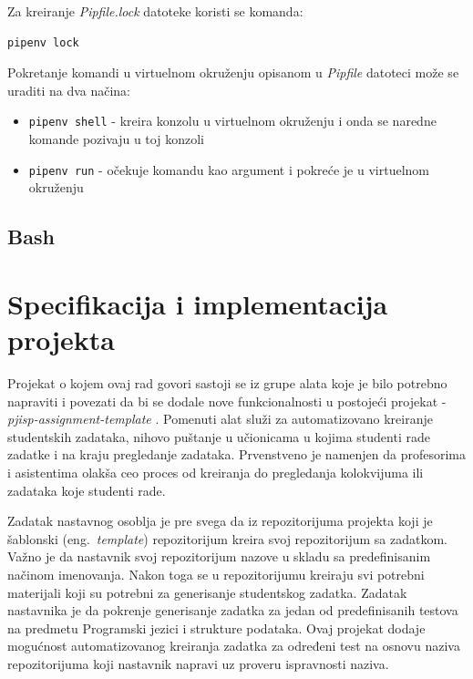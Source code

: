\documentclass[12pt]{report}
\begin{document}
Za kreiranje \textit{Pipfile.lock} datoteke koristi se komanda:

\begin{verbatim}
pipenv lock
\end{verbatim}

Pokretanje komandi u virtuelnom okruženju opisanom u \textit{Pipfile} datoteci može se uraditi na dva načina:

\begin{itemize}
    \item \texttt{pipenv shell} - kreira konzolu u virtuelnom okruženju i onda se naredne komande pozivaju u toj konzoli
    \item \texttt{pipenv run} - očekuje komandu kao argument i pokreće je u virtuelnom okruženju
\end{itemize}

\section{Bash}

\chapter{Specifikacija i implementacija projekta}

Projekat o kojem ovaj rad govori sastoji se iz grupe alata koje je bilo potrebno napraviti i povezati da bi se dodale nove funkcionalnosti u postojeći projekat - \textit{pjisp-assignment-template} \cite{pjisp-assignment-template}. Pomenuti alat služi za automatizovano kreiranje studentskih zadataka, nihovo puštanje u učionicama u kojima studenti rade zadatke i na kraju pregledanje zadataka. Prvenstveno je namenjen da profesorima i asistentima olakša ceo proces od kreiranja do pregledanja kolokvijuma ili zadataka koje studenti rade.

Zadatak nastavnog osoblja je pre svega da iz repozitorijuma projekta koji je šablonski (eng.\ \textit{template}) repozitorijum kreira svoj repozitorijum sa zadatkom. Važno je da nastavnik svoj repozitorijum nazove u skladu sa predefinisanim načinom imenovanja. Nakon toga se u repozitorijumu kreiraju svi potrebni materijali koji su potrebni za generisanje studentskog zadatka. Zadatak nastavnika je da pokrenje generisanje zadatka za jedan od predefinisanih testova na predmetu Programski jezici i strukture podataka. Ovaj projekat dodaje mogućnost automatizovanog kreiranja zadatka za određeni test na osnovu naziva repozitorijuma koji nastavnik napravi uz proveru ispravnosti naziva.
\end{document}
